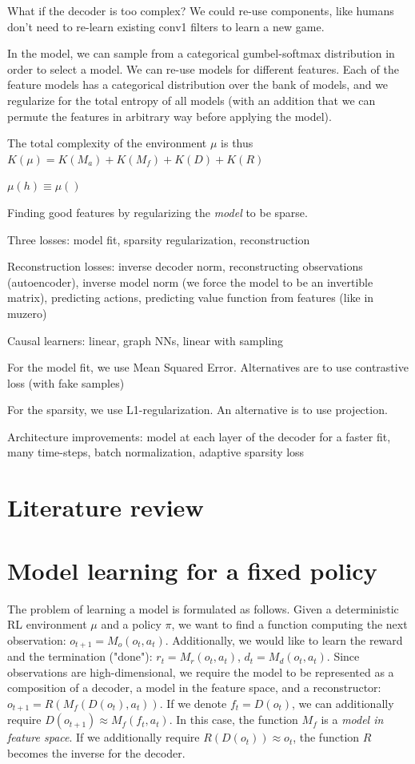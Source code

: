\documentclass[a4paper,11pt,oneside]{report}
\begin{document}
What if the decoder is too complex? We could re-use components, like humans don't need to re-learn existing conv1 filters to learn a new game.

In the model, we can sample from a categorical gumbel-softmax distribution in order to select a model. We can re-use models for different features. Each of the feature models has a categorical distribution over the bank of models, and we regularize for the total entropy of all models (with an addition that we can permute the features in arbitrary way before applying the model).


The total complexity of the environment $\mu$ is thus $K(\mu)=K(M_a)+K(M_f)+K(D)+K(R)$


$\mu(h)\equiv \mu()$

Finding good features by regularizing the {\em model} to be sparse.

Three losses: model fit, sparsity regularization, reconstruction

Reconstruction losses: inverse decoder norm, reconstructing observations (autoencoder), inverse model norm (we force the model to be an invertible matrix), predicting actions, predicting value function from features (like in muzero)

Causal learners: linear, graph NNs, linear with sampling

For the model fit, we use Mean Squared Error. Alternatives are to use contrastive loss (with fake samples)

For the sparsity, we use L1-regularization. An alternative is to use projection.

Architecture improvements: model at each layer of the decoder for a faster fit, many time-steps, batch normalization, adaptive sparsity loss

\section{Literature review}



\section{Model learning for a fixed policy}
The problem of learning a model is formulated as follows. Given a deterministic RL environment $\mu$ and a policy $\pi$, we want to find a function computing the next observation: $o_{t+1}=M_o(o_t, a_t)$. Additionally, we would like to learn the reward and the termination ("done"): $r_t=M_r(o_t, a_t)$, $d_t=M_d(o_t, a_t)$. Since observations are high-dimensional, we require the model to be represented as a composition of a decoder, a model in the feature space, and a reconstructor: $o_{t+1}=R(M_f(D(o_t), a_t))$. If we denote $f_t=D(o_t)$, we can additionally require $D(o_{t+1})\approx M_f(f_t, a_t)$. In this case, the function $M_f$ is a {\em model in feature space}. If we additionally require $R(D(o_t))\approx o_t$, the function $R$ becomes the inverse for the decoder.
\end{document}
